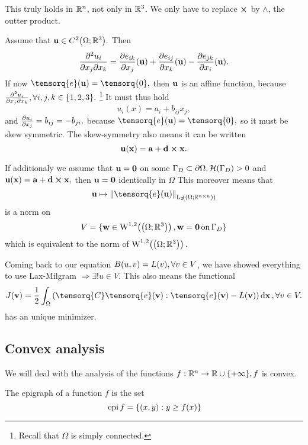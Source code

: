 \documentclass[11pt]{scrartcl} %
\begin{document}
\begin{remark}[$\R^n$]
    This truly holds in $\R^n$, not only in ${\mathbb R}^3$. We only have to replace $\cross$ by $\wedge$, the outter product.
\end{remark}

Assume that $\vb{u} \in C^2\qty(\Omega ; {\mathbb R}^3).$ Then
\[
	\pdv[2]{u_i}{x_j}{x_k} = \pdv{e_{ik}}{x_j}\qty(\vb{u}) + \pdv{e_{ij}}{x_k}\qty(\vb{u}) - \pdv{e_{jk}}{x_i}\qty(\vb{u}).
\]
If now $\tensorq{e}\qty(\vb{u}) = \tensorq{0}, $ then $\vb{u}$ is an affine function, because $\pdv[2]{u_i}{x_j}{x_k}, \forall i,j,k \in \{1, 2, 3\}.$ \footnote{Recall that $\Omega$ is simply connected.} It must thus hold
\[
	u_i(x) = a_i + b_{ij}x_j,
\]
and $\pdv{u_i}{x_j} = b_{ij} = - b_{ji},$ because $\tensorq{e}\qty(\vb{u}) = \tensorq{0},$ so it must be skew symmetric. The skew-symmetry also means it can be written
\[
	\vb{u}\qty(\vb{x}) = \vb{a} + \vb{d} \cross \vb{x}.
\]

If additionaly we assume that $\vb{u} = \vb{0}$ on some $\Gamma_D \subset \partial \Omega, \mathcal{H}\qty(\Gamma_{D})>0$ and $\vb{u}\qty(\vb{x}) = \vb{a}+ \vb{d} \cross \vb{x},$ then $\vb{u} = \vb{0}$ identically in $\Omega$
This moreover means that
\[
	\vb{u} \mapsto \norm{\tensorq{e}\qty(\vb{u})}_{\LpSet[2]{\qty(\Omega; \R^{n \times n})}}
\]
is a norm on
\[
	V = \{ \vb{w} \in \WkpSet[1][2]{\qty(\Omega; \R^3)}, \vb{w} = \vb{0} \, \text{on} \, \Gamma_D \}
\]
which is equivalent to the norm of $\WkpSet[1][2]{\qty(\Omega; \R^3)}.$

Coming back to our equation $B\qty(u,v) = L(v), \forall v \in V$, we have showed everything to use Lax-Milgram $\Rightarrow \exists ! u \in V.$ This also means the functional
\[
	J(\vb{v}) = \frac{1}{2} \int_{\Omega}\qty(\tensorq{C}\tensorq{e}\qty(\vb{v}) :\tensorq{e}\qty(\vb{v})-L\qty(\vb{v}))\dd{\vb{x}}, \forall v \in V.
\]
has an unique minimizer.

\subsection{Convex analysis}
\label{sec:convex_analysis}

We will deal with the analysis of the functions $f: {\mathbb R}^n \to {\mathbb R} \cup \{+ \infty \}, f$ is convex.

\begin{definition}
	The epigraph of a function $f$ is the set
	\[
		\, \text{epi} \, f = \{\qty(x,y): y \geq f(x) \}
	\]
\end{definition}
\end{document}
